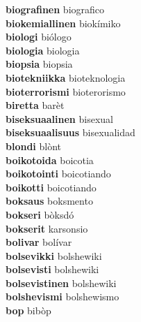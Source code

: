 \textbf{biografinen } biografico \\
\textbf{biokemiallinen } biokímiko \\
\textbf{biologi } biólogo \\
\textbf{biologia } biologia \\
\textbf{biopsia } biopsia \\
\textbf{biotekniikka } bioteknologia \\
\textbf{bioterrorismi } bioterorismo \\
\textbf{biretta } barèt \\
\textbf{biseksuaalinen } bisexual \\
\textbf{biseksuaalisuus } bisexualidad \\
\textbf{blondi } blònt \\
\textbf{boikotoida } boicotia \\
\textbf{boikotointi } boicotiando \\
\textbf{boikotti } boicotiando \\
\textbf{boksaus } boksmento \\
\textbf{bokseri } bòksdó \\
\textbf{bokserit } karsonsio \\
\textbf{bolivar } bolívar \\
\textbf{bolsevikki } bolshewiki \\
\textbf{bolsevisti } bolshewiki \\
\textbf{bolsevistinen } bolshewiki \\
\textbf{bolshevismi } bolshewismo \\
\textbf{bop } bibòp \\
